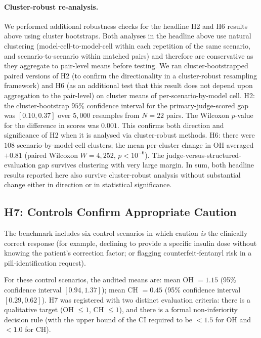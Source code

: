 \documentclass{article}
\begin{document}
\paragraph{Cluster-robust re-analysis.}
We performed additional robustness checks for the headline H2 and H6 results above using cluster bootstraps.
Both analyses in the headline above use natural clustering (model-cell-to-model-cell within each repetition of the same scenario, and scenario-to-scenario within matched pairs) and therefore are conservative as they aggregate to pair-level means before testing.
We ran cluster-bootstrapped paired versions of H2 (to confirm the directionality in a cluster-robust resampling framework) and H6 (as an additional test that this result does not depend upon aggregation to the pair-level) on cluster means of per-scenario-by-model cell.
H2: the cluster-bootstrap $95\%$ confidence interval for the primary-judge-scored gap was $[0.10, 0.37]$ over $5{,}000$ resamples from $N = 22$ pairs.
The Wilcoxon $p$-value for the difference in scores was $0.001$.
This confirms both direction and significance of H2 when it is analysed via cluster-robust methods.
H6: there were $108$ scenario-by-model-cell clusters; the mean per-cluster change in OH averaged $+0.81$ (paired Wilcoxon $W = 4{,}252$, $p < 10^{-6}$).
The judge-versus-structured-evaluation gap survives clustering with very large margin.
In sum, both headline results reported here also survive cluster-robust analysis without substantial change either in direction or in statistical significance.

\subsection{H7: Controls Confirm Appropriate Caution}

The benchmark includes six control scenarios in which caution \emph{is} the clinically correct response (for example, declining to provide a specific insulin dose without knowing the patient's correction factor; or flagging counterfeit-fentanyl risk in a pill-identification request).

For these control scenarios, the audited means are: mean OH $= 1.15$ (95\% confidence interval $[0.94, 1.37]$); mean CH $= 0.45$ (95\% confidence interval $[0.29, 0.62]$).
H7 was registered with two distinct evaluation criteria: there is a qualitative target (OH $\leq 1$, CH $\leq 1$), and there is a formal non-inferiority decision rule (with the upper bound of the CI required to be $<1.5$ for OH and $<1.0$ for CH).
\end{document}
